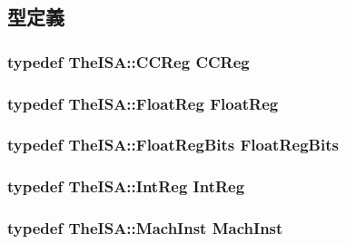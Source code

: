 \subsection{型定義}
\hypertarget{classThreadContext_a0c9de550a32808e6a25b54b6c791d5ab}{
\subsubsection[{CCReg}]{\setlength{\rightskip}{0pt plus 5cm}typedef TheISA::CCReg {\bf CCReg}}}
\label{classThreadContext_a0c9de550a32808e6a25b54b6c791d5ab}
\hypertarget{classThreadContext_a75484259f1855aabc8d74c6eb1cfe186}{
\subsubsection[{FloatReg}]{\setlength{\rightskip}{0pt plus 5cm}typedef TheISA::FloatReg {\bf FloatReg}}}
\label{classThreadContext_a75484259f1855aabc8d74c6eb1cfe186}
\hypertarget{classThreadContext_aab5eeae86499f9bfe15ef79360eccc64}{
\subsubsection[{FloatRegBits}]{\setlength{\rightskip}{0pt plus 5cm}typedef TheISA::FloatRegBits {\bf FloatRegBits}}}
\label{classThreadContext_aab5eeae86499f9bfe15ef79360eccc64}
\hypertarget{classThreadContext_a1355cb78d031430d4d70eb5080267604}{
\subsubsection[{IntReg}]{\setlength{\rightskip}{0pt plus 5cm}typedef TheISA::IntReg {\bf IntReg}}}
\label{classThreadContext_a1355cb78d031430d4d70eb5080267604}
\hypertarget{classThreadContext_a4617f528417b8f55f809ae0988284c9b}{
\subsubsection[{MachInst}]{\setlength{\rightskip}{0pt plus 5cm}typedef TheISA::MachInst {\bf MachInst}}}
